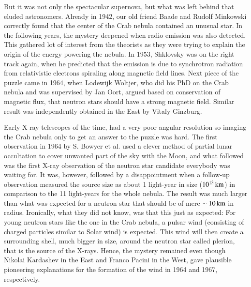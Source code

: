 But it was not only the spectacular supernova, but what was left behind that eluded astronomers.
Already in 1942, our old friend Baade and Rudolf Minkowski correctly found that the center of the Crab nebula contained an unusual star.\cite{Baade42, Minkowski42}
In the following years, the mystery deepened when radio emission was also detected.\cite{BSS49}
This gathered lot of interest from the theorists as they were trying to explain the origin of the energy powering the nebula.
In 1953, Shklovsky was on the right track again, when he predicted that the emission is due to synchrotron radiation from relativistic electrons spiraling along magnetic field lines.
Next piece of the puzzle came in 1964, when Lodewijk Woltjer, who did his PhD on the Crab nebula and was supervised by Jan Oort, argued based on conservation of magnetic flux, that neutron stars should have a strong magnetic field.\cite{Woltjer64}
Similar result was independently obtained in the East by Vitaly Ginzburg.\cite{Ginzburg64}


Early X-ray telescopes of the time, had a very poor angular resolution so imaging the Crab nebula only to get an answer to the puzzle was hard.
The first observation in 1964 by S. Bowyer et al. used a clever method of partial lunar occultation to cover unwanted part of the sky with the Moon, and what followed was the first X-ray observation of the neutron star candidate everybody was waiting for.\cite{BBC64a}
It was, however, followed by a disappointment when a follow-up observation measured the source size as about 1 light-year in size ($10^{13}\, \mathrm{km}$) in comparison to the 11 light-years for the whole nebula.\cite{BBC64b}
The result was much larger than what was expected for a neutron star that should be of mere $\sim 10\, \mathrm{km}$ in radius.
Ironically, what they did not know, was that this just as expected:
For young neutron stars like the one in the Crab nebula, a pulsar wind (consisting of charged particles similar to Solar wind) is expected. 
This wind will then create a surrounding shell, much bigger in size, around the neutron star called plerion, that is the source of the X-rays.
Hence, the mystery remained even though Nikolai Kardashev in the East and Franco Pacini in the West, gave plausible pioneering explanations for the formation of the wind in 1964 and 1967, respectively.\cite{Kardashev64, Pacini67}



